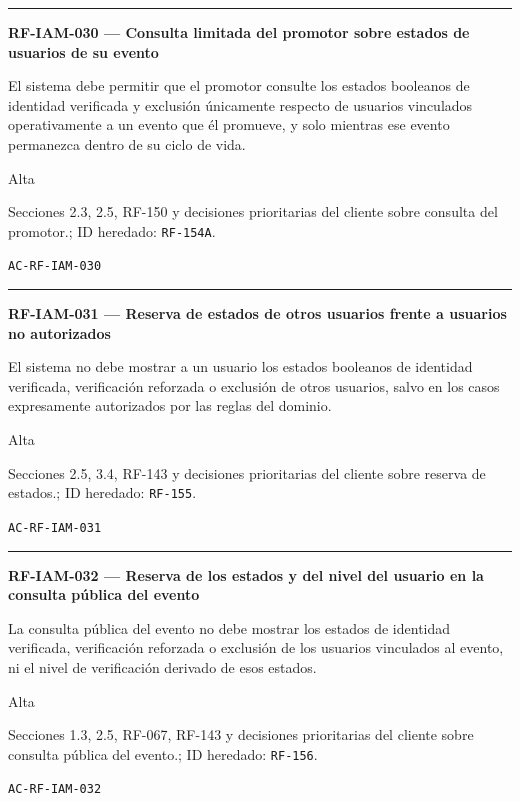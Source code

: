 \documentclass[10pt,letterpaper]{article}
\begin{document}
\vspace{0.25em}\hrule\vspace{0.65em}
\noindent\textbf{RF-IAM-030 --- Consulta limitada del promotor sobre estados de usuarios de su evento}\par
\begin{description}[style=nextline,leftmargin=3.15cm,labelwidth=2.8cm,font=\normalfont\bfseries]
\item[Obligación] El sistema debe permitir que el promotor consulte los estados booleanos de identidad verificada y exclusión únicamente respecto de usuarios vinculados operativamente a un evento que él promueve, y solo mientras ese evento permanezca dentro de su ciclo de vida.
\item[Prioridad] Alta
\item[Procedencia] Secciones 2.3, 2.5, RF-150 y decisiones prioritarias del cliente sobre consulta del promotor.; ID heredado: \texttt{RF-154A}.
\item[Verificación] \texttt{AC-RF-IAM-030}
\end{description}
\vspace{0.25em}\hrule\vspace{0.65em}
\noindent\textbf{RF-IAM-031 --- Reserva de estados de otros usuarios frente a usuarios no autorizados}\par
\begin{description}[style=nextline,leftmargin=3.15cm,labelwidth=2.8cm,font=\normalfont\bfseries]
\item[Obligación] El sistema no debe mostrar a un usuario los estados booleanos de identidad verificada, verificación reforzada o exclusión de otros usuarios, salvo en los casos expresamente autorizados por las reglas del dominio.
\item[Prioridad] Alta
\item[Procedencia] Secciones 2.5, 3.4, RF-143 y decisiones prioritarias del cliente sobre reserva de estados.; ID heredado: \texttt{RF-155}.
\item[Verificación] \texttt{AC-RF-IAM-031}
\end{description}
\vspace{0.25em}\hrule\vspace{0.65em}
\noindent\textbf{RF-IAM-032 --- Reserva de los estados y del nivel del usuario en la consulta pública del evento}\par
\begin{description}[style=nextline,leftmargin=3.15cm,labelwidth=2.8cm,font=\normalfont\bfseries]
\item[Obligación] La consulta pública del evento no debe mostrar los estados de identidad verificada, verificación reforzada o exclusión de los usuarios vinculados al evento, ni el nivel de verificación derivado de esos estados.
\item[Prioridad] Alta
\item[Procedencia] Secciones 1.3, 2.5, RF-067, RF-143 y decisiones prioritarias del cliente sobre consulta pública del evento.; ID heredado: \texttt{RF-156}.
\item[Verificación] \texttt{AC-RF-IAM-032}
\end{description}
\end{document}
